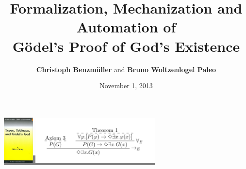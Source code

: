 \documentclass[9pt,mathserif,handout]{beamer}
\title[On G\"{o}del's Proof of God's
Existence]{Formalization, Mechanization and Automation of \\ G\"{o}del's
  Proof of God's Existence}
\author{\textbf{Christoph Benzm\"{u}ller} and \textbf{Bruno Woltzenlogel Paleo}}
\date[1.11.2013]{November 1, 2013}
\begin{document}
\begin{frame}
  \titlepage
\colorbox{gray}{\includegraphics[height=2.5cm]{buch7.jpg} }
\hfill
\colorbox{gray}{\includegraphics[height=2.5cm]{nd.png}}
\end{frame}












\end{document}
